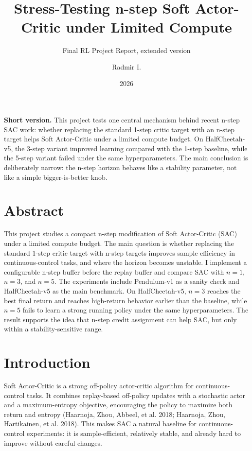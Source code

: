 \documentclass[
  american,
]{article}
\title{Stress-Testing n-step Soft Actor-Critic under Limited Compute}
\subtitle{Final RL Project Report, extended version}
\author{Radmir I.}
\date{2026}
\begin{document}
\maketitle

{
\setcounter{tocdepth}{3}
\tableofcontents
}
\begin{keybox}
\textbf{Short version.} This project tests one central mechanism behind recent n-step SAC work: whether replacing the standard 1-step critic target with an n-step target helps Soft Actor-Critic under a limited compute budget. On HalfCheetah-v5, the 3-step variant improved learning compared with the 1-step baseline, while the 5-step variant failed under the same hyperparameters. The main conclusion is deliberately narrow: the n-step horizon behaves like a stability parameter, not like a simple bigger-is-better knob.
\end{keybox}

\section{Abstract}\label{abstract}

This project studies a compact n-step modification of Soft Actor-Critic
(SAC) under a limited compute budget. The main question is whether
replacing the standard 1-step critic target with n-step targets improves
sample efficiency in continuous-control tasks, and where the horizon
becomes unstable. I implement a configurable n-step buffer before the
replay buffer and compare SAC with \(n=1\), \(n=3\), and \(n=5\). The
experiments include Pendulum-v1 as a sanity check and HalfCheetah-v5 as
the main benchmark. On HalfCheetah-v5, \(n=3\) reaches the best final
return and reaches high-return behavior earlier than the baseline, while
\(n=5\) fails to learn a strong running policy under the same
hyperparameters. The result supports the idea that n-step credit
assignment can help SAC, but only within a stability-sensitive range.

\section{Introduction}\label{introduction}

Soft Actor-Critic is a strong off-policy actor-critic algorithm for
continuous-control tasks. It combines replay-based off-policy updates
with a stochastic actor and a maximum-entropy objective, encouraging the
policy to maximize both return and entropy (Haarnoja, Zhou, Abbeel, et
al. 2018; Haarnoja, Zhou, Hartikainen, et al. 2018). This makes SAC a
natural baseline for continuous-control experiments: it is
sample-efficient, relatively stable, and already hard to improve without
careful changes.
\end{document}
